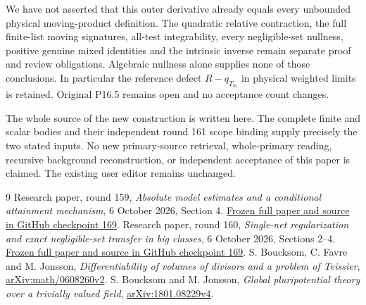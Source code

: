 \documentclass[11pt]{article}
\begin{document}
We have not asserted that this outer derivative already equals
every unbounded physical moving-product definition. The quadratic
relative contraction, the full finite-list moving signatures,
all-test integrability, every negligible-set nullness, positive
genuine mixed identities and the intrinsic inverse remain separate
proof and review obligations. Algebraic nullness alone supplies
none of those conclusions. In particular the reference defect
$R-q_{T_m}$ in physical weighted limits is retained.
Original P16.5 remains open and no acceptance count changes.

The whole source of the new construction is written here. The
complete finite and scalar bodies \cite{Finite,Scalar} and their independent
round 161 scope binding supply precisely the two stated inputs.
No new primary-source retrieval, whole-primary reading, recursive
background reconstruction, or independent acceptance of this paper
is claimed. The existing user editor remains unchanged.
\begin{thebibliography}{9}
 Research paper, round 159,
\emph{Absolute model estimates and a conditional attainment mechanism},
6 October 2026, Section 4.
\href{https://github.com/MingchenXia/nonarchimedean-pluripotential-theory/blob/2ec4386cbeec687e2a75a26b457ba9e7fd574aa0/research-checkpoints/continuation169/root-checks/public-P16.5-round159-partial-conditional-attainment-reader/paper.pdf}{Frozen full paper and source in GitHub checkpoint 169}.
 Research paper, round 160,
\emph{Single-net regularization and exact negligible-set transfer in big classes},
6 October 2026, Sections 2--4.
\href{https://github.com/MingchenXia/nonarchimedean-pluripotential-theory/blob/2ec4386cbeec687e2a75a26b457ba9e7fd574aa0/research-checkpoints/continuation169/root-checks/public-P16.5-round160-partial-negligible-transfer-reader/paper.pdf}{Frozen full paper and source in GitHub checkpoint 169}.
 S. Boucksom, C. Favre and M. Jonsson,
\emph{Differentiability of volumes of divisors and a problem of Teissier},
\href{https://arxiv.org/html/math/0608260v2}{arXiv:math/0608260v2}.
 S. Boucksom and M. Jonsson,
\emph{Global pluripotential theory over a trivially valued field},
\href{https://arxiv.org/pdf/1801.08229v4}{arXiv:1801.08229v4}.
\end{thebibliography}
\end{document}
